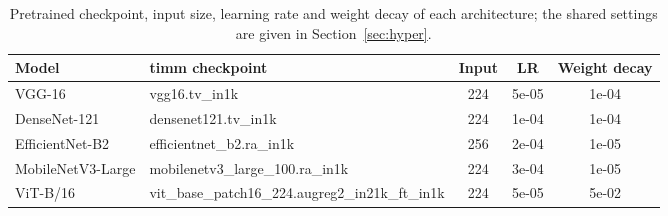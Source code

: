\begin{table}[!tbp]
\centering
\caption{Pretrained checkpoint, input size, learning rate and weight decay of each architecture; the shared settings are given in Section~\ref{sec:hyper}.}
\label{tab:hyper}
\footnotesize
\begin{tabular}{llccc}
\hline
Model & timm checkpoint & Input & LR & Weight decay \\
\hline
VGG-16 & vgg16.tv\_in1k & 224 & 5e-05 & 1e-04 \\
DenseNet-121 & densenet121.tv\_in1k & 224 & 1e-04 & 1e-04 \\
EfficientNet-B2 & efficientnet\_b2.ra\_in1k & 256 & 2e-04 & 1e-05 \\
MobileNetV3-Large & mobilenetv3\_large\_100.ra\_in1k & 224 & 3e-04 & 1e-05 \\
ViT-B/16 & vit\_base\_patch16\_224.augreg2\_in21k\_ft\_in1k & 224 & 5e-05 & 5e-02 \\
\hline
\end{tabular}
\end{table}